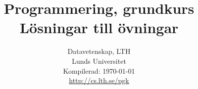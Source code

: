 \documentclass[a4paper]{compendium}
\title{
{\bf\Huge\sffamily  Programmering, grundkurs} 
\\ \vspace{2em}
{\sffamily  Lösningar till övningar }
}
\date{%
Datavetenskap, LTH \\ 
Lunds Universitet  \\
\vspace{1em}Kompilerad: \today\\
\vspace{2em}\url{http://cs.lth.se/pgk}
}
\newif\ifPreSolution  %
\begin{document}
\maketitle
\mainmatter
\tableofcontents

\ExerciseSolution{\ExeWeekONE}
\PreSolutionfalse 
\PreSolutionfalse 














\end{document}
